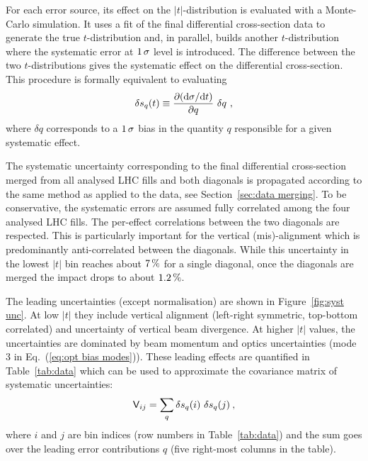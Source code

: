 For each error source, its effect on the $|t|$-distribution is evaluated with a Monte-Carlo simulation. It uses a fit of the final differential cross-section data to generate the true $t$-distribution and, in parallel, builds another $t$-distribution where the systematic error at $1\,{\rm \sigma}$ level is introduced. The difference between the two $t$-distributions gives the systematic effect on the differential cross-section. This procedure is formally equivalent to evaluating
\begin{equation}
\label{eq:syst mode}
\delta s_{q}(t) \equiv \frac{\partial({\rm d}\sigma/{\rm d} t)}{\partial q}\ \delta q\ ,
\end{equation}
where $\delta q$ corresponds to a $1\,{\rm \sigma}$ bias in the quantity $q$ responsible for a given systematic effect.

The systematic uncertainty corresponding to the final differential cross-section merged from all analysed LHC fills and both diagonals is propagated according to the same method as applied to the data, see Section~\ref{sec:data merging}. To be conservative, the systematic errors are assumed fully correlated among the four analysed LHC fills. The per-effect correlations between the two diagonals are respected. This is particularly important for the vertical (mis)-alignment which is predominantly anti-correlated between the diagonals. While this uncertainty in the lowest $|t|$ bin reaches about $7\,{\rm \%}$ for a single diagonal, once the diagonals are merged the impact drops to about $1.2\,{\rm \%}$.

The leading uncertainties (except normalisation) are shown in Figure~\ref{fig:syst unc}. At low $|t|$ they include vertical alignment (left-right symmetric, top-bottom correlated) and uncertainty of vertical beam divergence. At higher $|t|$ values, the uncertainties are dominated by beam momentum and optics uncertainties (mode 3 in Eq.~(\ref{eq:opt bias modes})). These leading effects are quantified in Table~\ref{tab:data} which can be used to approximate the covariance matrix of systematic uncertainties:
\begin{equation}
\label{eq:covar mat}
\mathsf{V}_{ij} = \sum_{q} \delta s_{q}(i)\ \delta s_{q}(j)\: ,
\end{equation}
where $i$ and $j$ are bin indices (row numbers in Table~\ref{tab:data}) and the sum goes over the leading error contributions $q$ (five right-most columns in the table).


